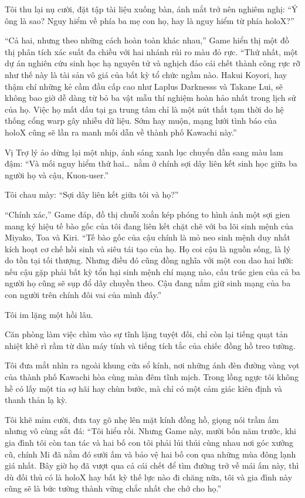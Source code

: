 \documentclass[../main.tex]{subfiles}
\begin{document}
Tôi thu lại nụ cười, đặt tập tài liệu xuống bàn, ánh mắt trở nên nghiêm nghị: ``Ý ông là sao? Nguy hiểm về phía ba mẹ con họ, hay là nguy hiểm từ phía holoX?''

``Cả hai, nhưng theo những cách hoàn toàn khác nhau,'' Game hiển thị một đồ thị phân tích xác suất đa chiều với hai nhánh rủi ro màu đỏ rực. ``Thứ nhất, một dự án nghiên cứu sinh học hạ nguyên tử và nghịch đảo cái chết thành công rực rỡ như thế này là tài sản vô giá của bất kỳ tổ chức ngầm nào. Hakui Koyori, hay thậm chí những kẻ cầm đầu cấp cao như Laplus Darknesss và Takane Lui, sẽ không bao giờ dễ dàng từ bỏ ba vật mẫu thí nghiệm hoàn hảo nhất trong lịch sử của họ. Việc họ mất dấu tại ga trung tâm chỉ là một nút thắt tạm thời do hệ thống cổng warp gây nhiễu dữ liệu. Sớm hay muộn, mạng lưới tình báo của holoX cũng sẽ lần ra manh mối dẫn về thành phố Kawachi này.''

Vị Trợ lý ảo dừng lại một nhịp, ánh sáng xanh lục chuyển dần sang màu lam đậm: ``Và mối nguy hiểm thứ hai\dots\ nằm ở chính sợi dây liên kết sinh học giữa ba người họ và cậu, Kuon-user.''

Tôi chau mày: ``Sợi dây liên kết giữa tôi và họ?''

``Chính xác,'' Game đáp, đồ thị chuỗi xoắn kép phóng to hình ảnh một sợi gien mang ký hiệu tế bào gốc của tôi đang liên kết chặt chẽ với ba lõi sinh mệnh của Miyako, Toa và Kiri. ``Tế bào gốc của cậu chính là mỏ neo sinh mệnh duy nhất kích hoạt cơ chế hồi sinh và siêu tái tạo của họ. Họ coi cậu là nguồn sống, là lý do tồn tại tối thượng. Nhưng điều đó cũng đồng nghĩa với một con dao hai lưỡi: nếu cậu gặp phải bất kỳ tổn hại sinh mệnh chí mạng nào, cấu trúc gien của cả ba người họ cũng sẽ sụp đổ dây chuyền theo. Cậu đang nắm giữ sinh mạng của ba con người trên chính đôi vai của mình đấy.''

Tôi im lặng một hồi lâu.

Căn phòng làm việc chìm vào sự tĩnh lặng tuyệt đối, chỉ còn lại tiếng quạt tản nhiệt khẽ rì rầm từ dàn máy tính và tiếng tích tắc của chiếc đồng hồ treo tường.

Tôi đưa mắt nhìn ra ngoài khung cửa sổ kính, nơi những ánh đèn đường vàng vọt của thành phố Kawachi hòa cùng màn đêm tĩnh mịch. Trong lồng ngực tôi không hề có lấy một tia sợ hãi hay chùn bước, mà chỉ có một cảm giác kiên định và thanh thản lạ kỳ.

Tôi khẽ mỉm cười, đưa tay gõ nhẹ lên mặt kính đồng hồ, giọng nói trầm ấm nhưng vô cùng sắt đá: ``Tôi hiểu rồi. Nhưng Game này, mười bốn năm trước, khi gia đình tôi còn tan tác và hai bố con tôi phải lủi thủi cùng nhau nơi góc xưởng cũ, chính Mi đã nằm đó sưởi ấm và bảo vệ hai bố con qua những mùa đông lạnh giá nhất. Bây giờ họ đã vượt qua cả cái chết để tìm đường trở về mái ấm này, thì dù đối thủ có là holoX hay bất kỳ thế lực nào đi chăng nữa, tôi và gia đình này cũng sẽ là bức tường thành vững chắc nhất che chở cho họ.''
\end{document}
